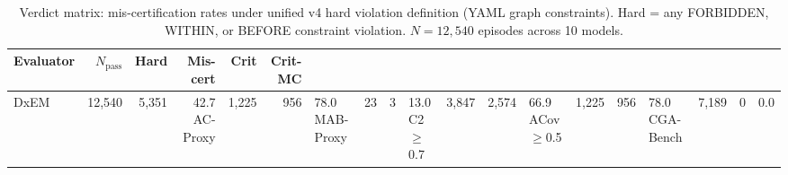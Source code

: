 \begin{table}[t]
\centering
\caption{Verdict matrix: mis-certification rates under unified v4 hard violation definition (YAML graph constraints). Hard = any FORBIDDEN, WITHIN, or BEFORE constraint violation. $N = 12,540$ episodes across 10 models.}
\label{tab:verdict-matrix-v6}
\begin{tabular}{lrrrrr}
\toprule
Evaluator & $N_{\text{pass}}$ & Hard & Mis-cert & Crit & Crit-MC \\
\midrule
DxEM & 12,540 & 5,351 & 42.7%
AC-Proxy & 1,225 & 956 & 78.0%
MAB-Proxy & 23 & 3 & 13.0%
C2$\geq$0.7 & 3,847 & 2,574 & 66.9%
ACov$\geq$0.5 & 1,225 & 956 & 78.0%
\midrule
CGA-Bench & 7,189 & 0 & 0.0%
\bottomrule
\end{tabular}
\end{table}

